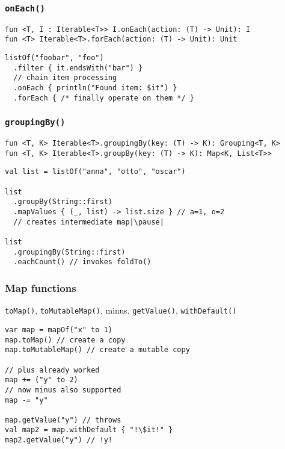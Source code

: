 \begin{frame}[fragile] \frametitle{\texttt{onEach()}}
\footnotesize{\texttt{fun <T, I : Iterable<T>> I.onEach(action: (T) -> Unit): I}} \\
\footnotesize{\texttt{fun <T> Iterable<T>.forEach(action: (T) -> Unit): Unit}}
\normalsize{}
\begin{lstlisting}
listOf("foobar", "foo")
  .filter { it.endsWith("bar") }
  // chain item processing
  .onEach { println("Found item: $it") }
  .forEach { /* finally operate on them */ }
\end{lstlisting}
\end{frame}

\begin{frame}[fragile] \frametitle{\texttt{groupingBy()}}
\footnotesize{\texttt{fun <T, K> Iterable<T>.groupingBy(key: (T) -> K): Grouping<T, K>}} \\
\footnotesize{\texttt{fun <T, K> Iterable<T>.groupBy(key: (T) -> K): Map<K, List<T>>}}
\begin{lstlisting}
val list = listOf("anna", "otto", "oscar")

list
  .groupBy(String::first)
  .mapValues { (_, list) -> list.size } // a=1, o=2
  // creates intermediate map|\pause|

list
  .groupingBy(String::first)
  .eachCount() // invokes foldTo()
\end{lstlisting}
\end{frame}

\begin{frame}[fragile] \frametitle{Map functions}
\texttt{toMap()}, \texttt{toMutableMap()}, minus, \texttt{getValue()}, \texttt{withDefault()}
\begin{lstlisting}
var map = mapOf("x" to 1)
map.toMap() // create a copy
map.toMutableMap() // create a mutable copy

// plus already worked
map += ("y" to 2)
// now minus also supported
map -= "y"

map.getValue("y") // throws
val map2 = map.withDefault { "!\$it!" }
map2.getValue("y") // !y!
\end{lstlisting}
\end{frame}

